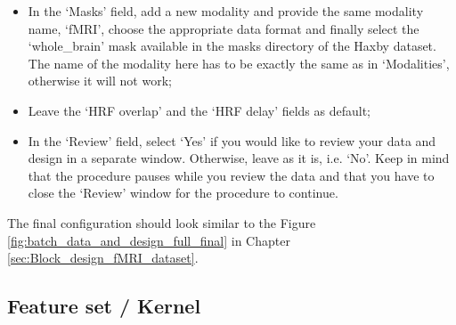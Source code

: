 \begin{itemize}
\begin{itemize}
		\end{itemize}
	
	\item In the `Masks' field, add a new modality and provide the same modality name, `fMRI', choose the appropriate data format and finally select the `whole\_brain' mask available in the masks directory of the Haxby dataset. The name of the modality here has to be exactly the same as in `Modalities', otherwise it will not work;
	
	\item Leave the `HRF overlap' and the `HRF delay' fields as default;
	
	\item In the `Review' field, select `Yes' if you would like to review your data and design in a separate window. Otherwise, leave as it is, i.e. `No'. Keep in mind that the procedure pauses while you review the data and that you have to close the `Review' window for the procedure to continue.

\end{itemize}

The final configuration should look similar to the Figure \ref{fig:batch_data_and_design_full_final} in Chapter \ref{sec:Block_design_fMRI_dataset}.


\subsection{Feature set / Kernel}

